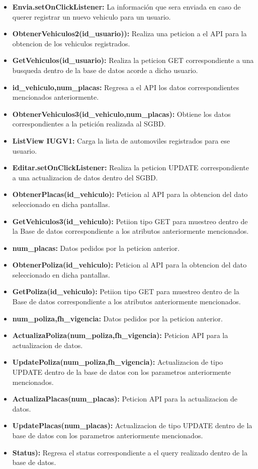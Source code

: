 \begin{itemize}
	\item \textbf{Envia.setOnClickListener:} La información que sera enviada en caso de querer registrar un nuevo vehiculo para un usuario.
	\item \textbf{ObtenerVehiculos2(id_usuario)):} Realiza una peticion a el API para la obtencion de los vehiculos registrados.
	\item \textbf{GetVehiculos(id_usuario):} Realiza la peticion GET correspondiente a una busqueda dentro de la base de datos acorde a dicho usuario.
	\item \textbf{id_vehiculo,num_placas:} Regresa a el API los datos correspondientes mencionados anteriormente.
	\item \textbf{ObtenerVehiculos3(id_vehiculo,num_placas):} Obtiene los datos correspondientes a la petición realizada al SGBD.
	\item \textbf{ListView IUGV1:} Carga la lista de automoviles registrados para ese usuario.
	\item \textbf{Editar.setOnClickListener:} Realiza la peticion UPDATE correspondiente a una actualizacion de datos dentro del SGBD.
	\item \textbf{ObtenerPlacas(id_vehiculo):} Peticion al API para la obtencion del dato seleccionado en dicha pantallas.
	\item \textbf{GetVehiculos3(id_vehiculo):} Petiion tipo GET para muestreo dentro de la Base de datos correspondiente a los atributos anteriormente mencionados.
	\item \textbf{num_placas:} Datos pedidos por la peticion anterior.
	\item \textbf{ObtenerPoliza(id_vehiculo):} Peticion al API para la obtencion del dato seleccionado en dicha pantallas.
	\item \textbf{GetPoliza(id_vehiculo):} Petiion tipo GET para muestreo dentro de la Base de datos correspondiente a los atributos anteriormente mencionados.
	\item \textbf{num_poliza,fh_vigencia:} Datos pedidos por la peticion anterior.
	\item \textbf{ActualizaPoliza(num_poliza,fh_vigencia):} Peticion API para la actualizacion de datos.
	\item \textbf{UpdatePoliza(num_poliza,fh_vigencia):} Actualizacion de tipo UPDATE dentro de la base de datos con los parametros anteriormente mencionados.
	\item \textbf{ActualizaPlacas(num_placas):} Peticion API para la actualizacion de datos.
	\item \textbf{UpdatePlacas(num_placas):} Actualizacion de tipo UPDATE dentro de la base de datos con los parametros anteriormente mencionados.
	\item \textbf{Status):} Regresa el status correspondiente a el query realizado dentro de la base de datos.



\end{itemize}



